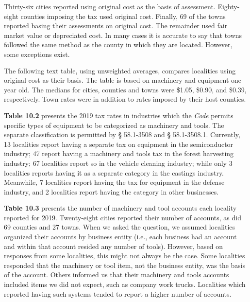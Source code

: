 \documentclass[
]{book}
\newenvironment{Shaded}{\begin{snugshade}}{\end{snugshade}}
\newcommand{\CommentTok}[1]{\textcolor[rgb]{0.56,0.35,0.01}{\textit{#1}}}
\begin{document}
Thirty-six cities reported using original cost as the basis of assessment. Eighty-eight counties imposing the tax used original cost. Finally, 69 of the towns reported basing their assessments on original cost. The remainder used fair market value or depreciated cost. In many cases it is accurate to say that towns followed the same method as the county in which they are located. However, some exceptions exist.

The following text table, using unweighted averages, compares localities using original cost as their basis. The table is based on machinery and equipment one year old. The medians for cities, counties and towns were \$1.05, \$0.90, and \$0.39, respectively. Town rates were in addition to rates imposed by their host counties.

\begin{Shaded}
\end{Shaded}

\textbf{Table 10.2} presents the 2019 tax rates in industries which the \emph{Code} permits specific types of equipment to be categorized as machinery and tools. The separate classification is permitted by § 58.1-3508 and § 58.1-3508.1. Currently, 13 localities report having a separate tax on equipment in the semiconductor industry; 47 report having a machinery and tools tax in the forest harvesting industry; 67 localities report so in the vehicle cleaning industry; while only 3 localities reports having it as a separate category in the castings industry. Meanwhile, 7 localities report having the tax for equipment in the defense industry, and 2 localities report having the category in other businesses.

\textbf{Table 10.3} presents the number of machinery and tool accounts each locality reported for 2019. Twenty-eight cities reported their number of accounts, as did 69 counties and 27 towns. When we asked the question, we assumed localities organized their accounts by business entity (i.e., each business had an account and within that account resided any number of tools). However, based on responses from some localities, this might not always be the case. Some localities responded that the machinery or tool item, not the business entity, was the basis of the account. Others informed us that their machinery and tools accounts included items we did not expect, such as company work trucks. Localities which reported having such systems tended to report a higher number of accounts.
\end{document}

